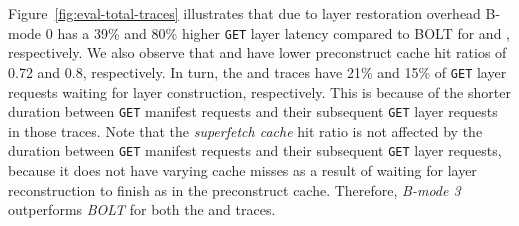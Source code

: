 Figure~\ref{fig:eval-total-traces} illustrates that due to layer restoration overhead
B-mode 0 has a 39\% and 80\% higher \texttt{GET} layer latency
compared to BOLT for \fra and \lon, respectively.
%
We also observe that \fra and \lon have lower preconstruct
cache hit ratios of 0.72 and 0.8, respectively.
%
In turn, the \fra and \lon traces have 21\% and 15\% of \texttt{GET} layer
requests waiting for layer construction, respectively.
%
%
This is because of the shorter duration between \texttt{GET} manifest requests and
their subsequent \texttt{GET} layer requests in those traces.
%
Note that the \emph{superfetch cache} hit ratio is not affected by the duration 
between \texttt{GET} manifest requests and their subsequent \texttt{GET} layer 
requests, because it does not have varying cache misses as a result of waiting 
for layer reconstruction to finish as in the preconstruct cache.
%
%
Therefore, \emph{B-mode 3} outperforms \emph{BOLT} for both the \fra and \lon traces.
%
%
%


